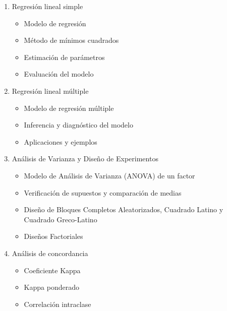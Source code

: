 \documentclass[12pt]{article}
\begin{document}
\begin{enumerate}
    \item{Regresión lineal simple}
    \begin{itemize}
        \item Modelo de regresión
        \item Método de mínimos cuadrados
        \item Estimación de parámetros
        \item Evaluación del modelo
    \end{itemize}

    \item{Regresión lineal múltiple}
    \begin{itemize}
        \item Modelo de regresión múltiple
        \item Inferencia y diagnóstico del modelo
        \item Aplicaciones y ejemplos
    \end{itemize}

    \item{Análisis de Varianza y Diseño de Experimentos}
    \begin{itemize}
        \item Modelo de Análisis de Varianza (ANOVA) de un factor
        \item Verificación de supuestos y comparación de medias
        \item Diseño de Bloques Completos Aleatorizados, Cuadrado Latino y Cuadrado Greco-Latino
        \item Diseños Factoriales
    \end{itemize}

    \item{Análisis de concordancia}
    \begin{itemize}
        \item Coeficiente Kappa
        \item Kappa ponderado
        \item Correlación intraclase
    \end{itemize}

\end{enumerate}
\end{document}
